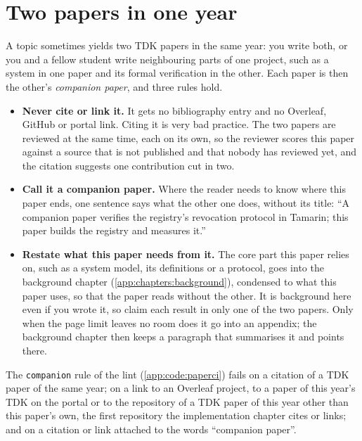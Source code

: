 \section{Two papers in one year}\label{app:tdk:companion}
A topic sometimes yields two TDK papers in the same year: you write both, or you and a fellow student write neighbouring parts of one project, such as a system in one paper and its formal verification in the other. Each paper is then the other's \emph{companion paper}, and three rules hold.
\begin{itemize}
  \item \textbf{Never cite or link it.} It gets no bibliography entry and no Overleaf, GitHub or portal link. Citing it is very bad practice. The two papers are reviewed at the same time, each on its own, so the reviewer scores this paper against a source that is not published and that nobody has reviewed yet, and the citation suggests one contribution cut in two.
  \item \textbf{Call it a companion paper.} Where the reader needs to know where this paper ends, one sentence says what the other one does, without its title: \enquote{A companion paper verifies the registry's revocation protocol in Tamarin; this paper builds the registry and measures it.}
  \item \textbf{Restate what this paper needs from it.} The core part this paper relies on, such as a system model, its definitions or a protocol, goes into the background chapter (\cref{app:chapters:background}), condensed to what this paper uses, so that the paper reads without the other. It is background here even if you wrote it, so claim each result in only one of the two papers. Only when the page limit leaves no room does it go into an appendix; the background chapter then keeps a paragraph that summarises it and points there.
\end{itemize}
The \texttt{companion} rule of the lint (\cref{app:code:paperci}) fails on a citation of a TDK paper of the same year; on a link to an Overleaf project, to a paper of this year's TDK on the portal or to the repository of a TDK paper of this year other than this paper's own, the first repository the implementation chapter cites or links; and on a citation or link attached to the words \enquote{companion paper}.

